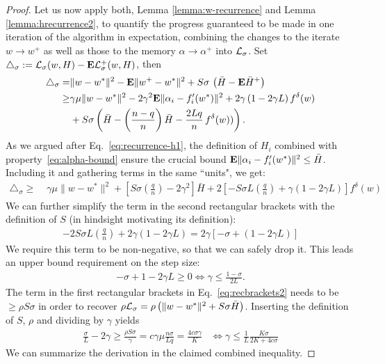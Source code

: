 \begin{lemma}
\begin{proof}
Let us now apply both, Lemma \ref{lemma:w-recurrence} and Lemma \ref{lemma:hrecurrence2}, to quantify the progress guaranteed to be made in one iteration of the algorithm in expectation, combining the changes to the iterate $w \to w^+$ as well as those to the memory $\alpha \to \alpha^+$ into ${\mathcal L}_\sigma$. Set $\triangle_\sigma := {\mathcal L}_\sigma(w,H) - {\mathbf E} {\mathcal L}_\sigma^+(w,H)$, then 
\begin{align}
\triangle_\sigma  = &  \| w- w^*\|^2 - {\mathbf E} \| w^+ - w^*\|^2 + S \sigma \,  \left( \bar H - {\mathbf E} \bar H^+ \right) \\
\ge &  \gamma \mu \| w- w^*\|^2  - 2 \gamma^2  {\mathbf E} \| \alpha_i - f_i'(w^*)\|^2  + 2\gamma \left( 1 - 2\gamma L  \right) f^\delta(w) \nonumber \\
& + S \sigma \left( \bar H -  \left( \frac{n-q}{n} \right) \bar H - \frac{2Lq}{n} \, f^\delta(w) ) \right).
\nonumber
\end{align}
As we argued after Eq.~\eqref{eq:recurrence-h1}, the definition of $H_i$ combined with property~\eqref{eq:alpha-bound} ensure the crucial bound ${\mathbf E}\| \alpha_i - f_i'(w^*) \|^2 \le \bar H$. Including it and gathering terms in the same ``units", we get: 
\begin{align}
\triangle_\sigma \ge &  \; \gamma \mu \| w- w^*\|^2 + 
\left[ S \sigma \left( \frac qn \right) - 2 \gamma^2  \right] \bar H 
 \label{eq:recbrackets2}
+ 2 \left[ 
   -S \sigma  L \left( \frac qn \right) 
  + \gamma \left( 1 -2 \gamma L \right) 
\right] f^\delta(w) 
\end{align}
We can further simplify the term in the second rectangular brackets with the definition of $S$ (in hindsight motivating its definition):
\begin{align}
- 2S \sigma  L \left( \frac qn \right)  + 2\gamma \left( 1 - 2\gamma L\right)
= 2\gamma \left[ -\sigma + \left( 1 - 2 \gamma L \right) \right] 
\end{align}
We require this term to be non-negative, so that we can safely drop it. This leads an upper bound requirement on the step size:
\begin{align}
- \sigma + 1 - 2\gamma L \ge 0 \iff 
\gamma \leq \frac{1- \sigma}{2 L}.
\end{align}
The term in the first rectangular brackets in Eq.~\eqref{eq:recbrackets2} needs to be $\ge \rho S \sigma$ in order to recover $\rho {\mathcal L}_\sigma = \rho \left( \| w- w^*\|^2 + S \sigma \bar H \right)$. Inserting the definition of $S$, $\rho$ and dividing by $\gamma$ yields 
\begin{align}
\frac {\sigma}{L} - 2 \gamma \ge \frac{\rho S \sigma}{\gamma}
 = c \gamma \mu \frac{n \sigma}{L q} = \frac{4c  \sigma \gamma}{K}
%
& \iff \gamma \le  \frac 1L \frac{K \sigma}{2 K + 4 c \sigma}
\end{align}
We can summarize the derivation in the claimed combined inequality.
\end{proof} 
\end{lemma}

